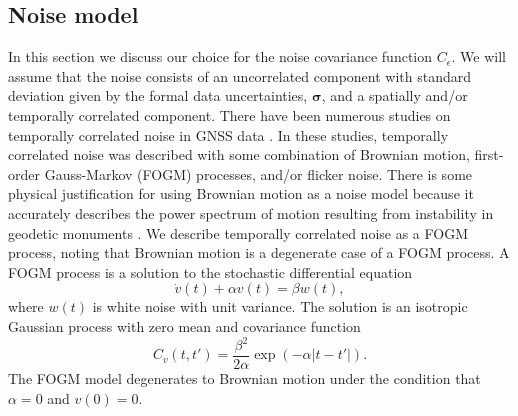 \documentclass[10pt,a4paper]{article}
\begin{document}
\subsection{Noise model}
In this section we discuss our choice for the noise covariance function $C_\epsilon$. We will assume that the noise consists of an uncorrelated component with standard deviation given by the formal data uncertainties, $\bm{\sigma}$, and a spatially and/or temporally correlated component. There have been numerous studies on temporally correlated noise in GNSS data \citep[e.g.,]{Zhang1997,Mao1999,Williams2004,Langbein2008}. In these studies, temporally correlated noise was described with some combination of Brownian motion, first-order Gauss-Markov (FOGM) processes, and/or flicker noise. There is some physical justification for using Brownian motion as a noise model because it accurately describes the power spectrum of motion resulting from instability in geodetic monuments \citep[e.g.,][]{Wyatt1982,Wyatt1989,Langbein1997}. We describe temporally correlated noise as a FOGM process, noting that Brownian motion is a degenerate case of a FOGM process. A FOGM process is a solution to the stochastic differential equation
\begin{equation}
\dot{v}(t) + \alpha v(t) = \beta w(t),
\end{equation}
where $w(t)$ is white noise with unit variance. The solution is an isotropic Gaussian process with zero mean and covariance function
\begin{equation}\label{eq:FOGM}
C_v(t,t') = \frac{\beta^2}{2\alpha}\exp\left(-\alpha|t - t'|\right). 
\end{equation}
The FOGM model degenerates to Brownian motion under the condition that $\alpha = 0$ and $v(0) = 0$. 
\end{document}
